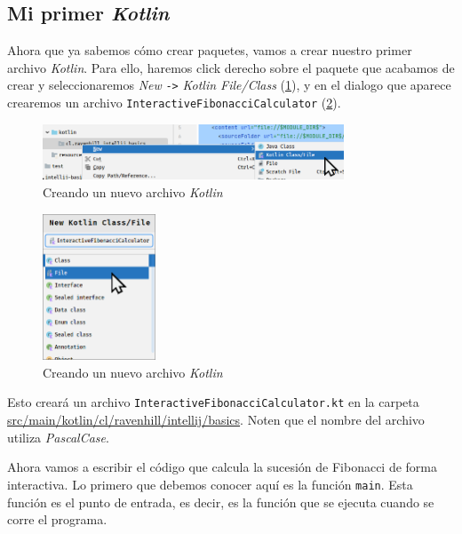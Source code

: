 
\subsection{Mi primer \textit{Kotlin}}
  Ahora que ya sabemos cómo crear paquetes, vamos a crear nuestro primer archivo \textit{Kotlin}.
  Para ello, haremos click derecho sobre el paquete que acabamos de crear y seleccionaremos
  \textit{New} \texttt{->} \textit{Kotlin File/Class} (\cref{fig:idea64_new_kotlin_file}), y en
  el dialogo que aparece crearemos un archivo \texttt{InteractiveFibonacciCalculator} 
  (\cref{fig:idea64_new_kotlin_file_dialog}).

  \begin{figure}[ht!]
    \centering
    \includegraphics[width=0.8\textwidth]{img/Por_algo_se_empieza/idea64_new_kotlin_file.png}
    \caption{Creando un nuevo archivo \textit{Kotlin}}
    \label{fig:idea64_new_kotlin_file}
  \end{figure}

  \begin{figure}[H]
    \centering
    \includegraphics[width=0.3\textwidth]{img/Por_algo_se_empieza/idea64_new_kotlin_file_dialog.png}
    \caption{Creando un nuevo archivo \textit{Kotlin}}
    \label{fig:idea64_new_kotlin_file_dialog}
  \end{figure}

  Esto creará un archivo \texttt{InteractiveFibonacciCalculator.kt} en la carpeta
  \url{src/main/kotlin/cl/ravenhill/intellij/basics}.
  Noten que el nombre del archivo utiliza \textit{PascalCase}.

  Ahora vamos a escribir el código que calcula la sucesión de Fibonacci de forma interactiva.
  Lo primero que debemos conocer aquí es la función \texttt{main}.
  Esta función es el punto de entrada, es decir, es la función que se ejecuta cuando se corre el
  programa.

